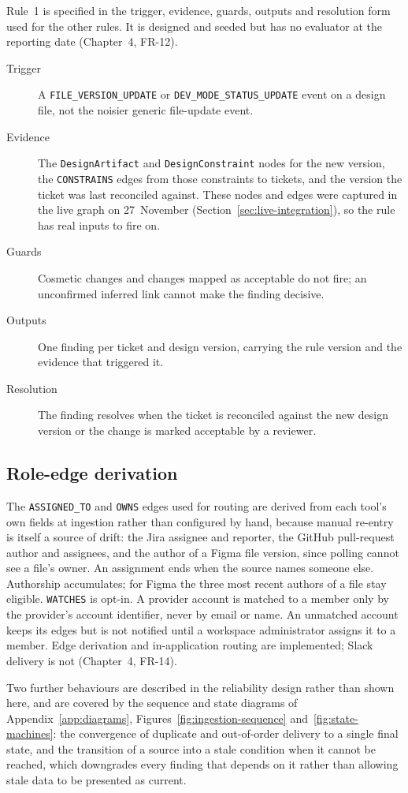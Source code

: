 Rule~1 is specified in the trigger, evidence, guards, outputs and resolution form
used for the other rules. It is designed and seeded but has no evaluator at the
reporting date (Chapter~4, FR-12).
\begin{description}
  \item[Trigger] A \texttt{FILE\_VERSION\_UPDATE} or
    \texttt{DEV\_MODE\_STATUS\_UPDATE} event on a design file, not the noisier
    generic file-update event.
  \item[Evidence] The \texttt{DesignArtifact} and \texttt{DesignConstraint}
    nodes for the new version, the \texttt{CONSTRAINS} edges from those
    constraints to tickets, and the version the ticket was last reconciled
    against. These nodes and edges were captured in the live graph on
    27~November (Section~\ref{sec:live-integration}), so the rule has real
    inputs to fire on.
  \item[Guards] Cosmetic changes and changes mapped as acceptable do not fire;
    an unconfirmed inferred link cannot make the finding decisive.
  \item[Outputs] One finding per ticket and design version, carrying the rule
    version and the evidence that triggered it.
  \item[Resolution] The finding resolves when the ticket is reconciled against
    the new design version or the change is marked acceptable by a reviewer.
\end{description}

\subsection*{Role-edge derivation}

The \texttt{ASSIGNED\_TO} and \texttt{OWNS} edges used for routing are derived
from each tool's own fields at ingestion rather than configured by hand,
because manual re-entry is itself a source of drift: the Jira assignee and
reporter, the GitHub pull-request author and assignees, and the author of a
Figma file version, since polling cannot see a file's owner. An assignment ends
when the source names someone else. Authorship accumulates; for Figma the three
most recent authors of a file stay eligible. \texttt{WATCHES} is opt-in. A
provider account is matched to a member only by the provider's account
identifier, never by email or name. An unmatched account keeps its edges but is
not notified until a workspace administrator assigns it to a member. Edge
derivation and in-application routing are implemented; Slack delivery is not
(Chapter~4, FR-14).

Two further behaviours are described in the reliability design rather than shown
here, and are covered by the sequence and state diagrams of
Appendix~\ref{app:diagrams}, Figures~\ref{fig:ingestion-sequence}
and~\ref{fig:state-machines}: the
convergence of duplicate and out-of-order delivery to a single final state, and
the transition of a source into a stale condition when it cannot be reached,
which downgrades every finding that depends on it rather than allowing stale
data to be presented as current.
